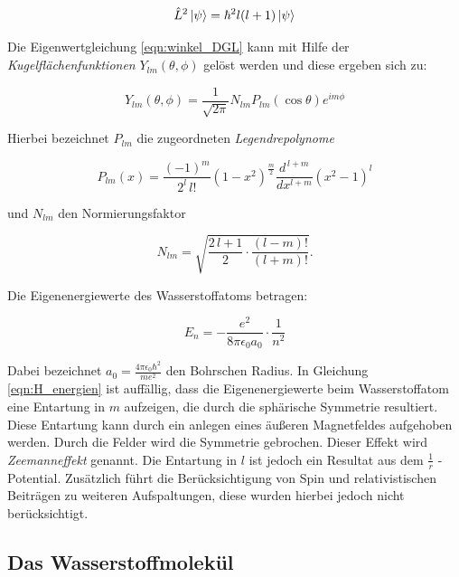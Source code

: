 \begin{equation}
    \hat{L}^2 \ket{\psi} = \hbar^2 l(l+1) \ket{\psi}
    \label{eqn:L}
\end{equation}

Die Eigenwertgleichung \eqref{eqn:winkel_DGL} kann mit Hilfe der \textit{Kugelflächenfunktionen} $Y_{lm} (\theta, \phi)$ gelöst werden und diese ergeben sich zu:

\begin{equation}
    Y_{lm} (\theta, \phi) = \frac{1}{\sqrt{2 \pi}} N_{lm} P_{lm} (\cos \theta) e^{im\phi}
    \label{eqn:kugelflaechen}
\end{equation}

Hierbei bezeichnet $P_{lm}$ die zugeordneten \textit{Legendrepolynome}

\begin{equation}
    P_{lm} (x) = \frac{(-1)^m}{2^l \, l!} \left( 1-x^2 \right)^{\! \frac{m}{2}} \frac{d^{\, l+m}}{dx^{l+m}} \left( x^2 - 1 \right)^l
    \label{eqn:legendre}
\end{equation}

und $N_{lm}$ den Normierungsfaktor

\begin{equation}
    N_{lm} = \sqrt{\frac{2 \, l +1}{2} \cdot \frac{(l-m)!}{(l+m)!}} .
    \label{eqn:normierung}
\end{equation}

Die Eigenenergiewerte des Wasserstoffatoms betragen:

\begin{equation}
    E_n = - \frac{e^2}{8 \pi \epsilon_0 a_0} \cdot \frac{1}{n^2}
    \label{eqn:H_energien}
\end{equation}

Dabei bezeichnet $a_0 = \frac{4 \pi \epsilon_0 \hbar^2}{m e^2}$ den Bohrschen Radius. In Gleichung \eqref{eqn:H_energien} ist auffällig, dass die Eigenenergiewerte beim Wasserstoffatom eine Entartung in $m$ aufzeigen, die durch die sphärische Symmetrie resultiert. Diese Entartung kann durch ein anlegen eines äußeren Magnetfeldes aufgehoben werden. Durch die Felder wird die Symmetrie gebrochen. Dieser Effekt wird \textit{Zeemanneffekt} genannt. Die Entartung in $l$ ist jedoch ein Resultat aus dem $\frac{1}{r}$ - Potential. Zusätzlich führt die Berücksichtigung von Spin und relativistischen Beiträgen zu weiteren Aufspaltungen, diese wurden hierbei jedoch nicht berücksichtigt.

\subsection{Das Wasserstoffmolekül}
\label{sec:H2}

